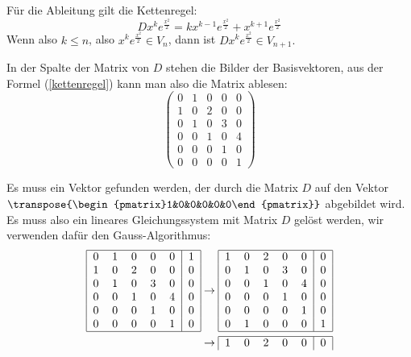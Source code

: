 \begin{loesung}
\begin{teilaufgaben}
\item Für die Ableitung gilt die Kettenregel:
\begin{equation}
Dx^ke^{\frac{x^2}2}=kx^{k-1}e^{\frac{x^2}2}+x^{k+1}e^{\frac{x^2}2}
\label{kettenregel}
\end{equation}
Wenn also $k\le n$, also $x^ke^{\frac{x^2}2}\in V_n$, dann ist
$Dx^ke^{\frac{x^2}2}\in V_{n+1}.$
\item
In der Spalte der Matrix von $D$ stehen die Bilder der Basisvektoren,
aus der Formel (\ref{kettenregel}) kann man also die Matrix ablesen:
\[
\begin{pmatrix}
0&1&0&0&0\\
1&0&2&0&0\\
0&1&0&3&0\\
0&0&1&0&4\\
0&0&0&1&0\\
0&0&0&0&1
\end{pmatrix}
\]
\item
Es muss ein Vektor gefunden werden, der durch die Matrix $D$ auf
den Vektor $\transpose{\begin{pmatrix}1&0&0&0&0&0\end{pmatrix}}$
abgebildet wird. Es muss also ein lineares Gleichungssystem mit
Matrix $D$ gelöst werden, wir verwenden dafür den Gauss-Algorithmus:
\begin{align*}
\begin{tabular}{|ccccc|c|}
\hline
0&1&0&0&0&1\\
1&0&2&0&0&0\\
0&1&0&3&0&0\\
0&0&1&0&4&0\\
0&0&0&1&0&0\\
0&0&0&0&1&0\\
\hline
\end{tabular}
&\rightarrow
\begin{tabular}{|ccccc|c|}
\hline
1&0&2&0&0&0\\
0&1&0&3&0&0\\
0&0&1&0&4&0\\
0&0&0&1&0&0\\
0&0&0&0&1&0\\
0&1&0&0&0&1\\
\hline
\end{tabular}
\\
&\rightarrow
\begin{tabular}{|ccccc|c|}
\hline
1&0&2&0&0&0\\

\end{tabular}
\end{align*}
\end{teilaufgaben}
\end{loesung}
